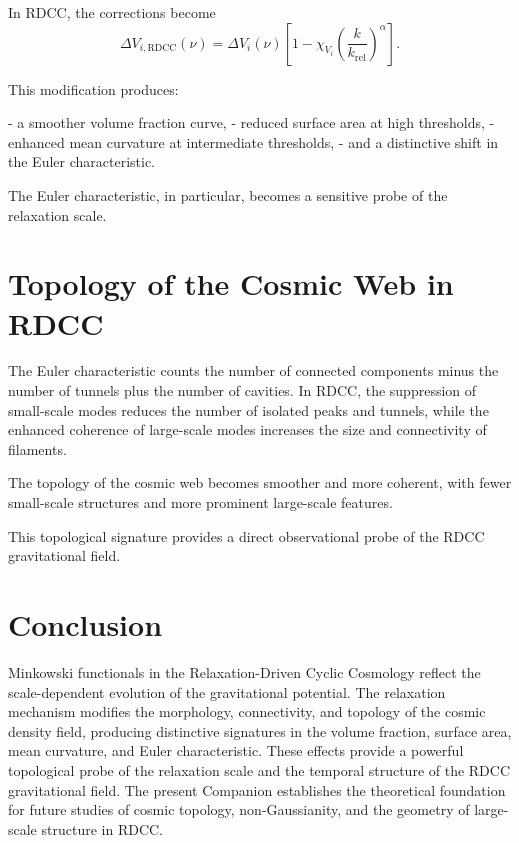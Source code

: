 \documentclass[11pt,a4paper]{article}
\begin{document}
In RDCC, the corrections become
\begin{equation}
    \Delta V_{i,\mathrm{RDCC}}(\nu)
    = \Delta V_{i}(\nu)
      \left[
        1 - \chi_{V_{i}}
        \left(\frac{k}{k_{\mathrm{rel}}}\right)^{\alpha}
      \right].
\end{equation}

This modification produces:

- a smoother volume fraction curve,  
- reduced surface area at high thresholds,  
- enhanced mean curvature at intermediate thresholds,  
- and a distinctive shift in the Euler characteristic.

The Euler characteristic, in particular, becomes a sensitive probe of the 
relaxation scale.
\section{Topology of the Cosmic Web in RDCC}

The Euler characteristic counts the number of connected components minus the number 
of tunnels plus the number of cavities. In RDCC, the suppression of small-scale 
modes reduces the number of isolated peaks and tunnels, while the enhanced 
coherence of large-scale modes increases the size and connectivity of filaments.

The topology of the cosmic web becomes smoother and more coherent, with fewer 
small-scale structures and more prominent large-scale features.

This topological signature provides a direct observational probe of the RDCC 
gravitational field.
\section{Conclusion}

Minkowski functionals in the Relaxation-Driven Cyclic Cosmology reflect the 
scale-dependent evolution of the gravitational potential. The relaxation mechanism 
modifies the morphology, connectivity, and topology of the cosmic density field, 
producing distinctive signatures in the volume fraction, surface area, mean 
curvature, and Euler characteristic. These effects provide a powerful topological 
probe of the relaxation scale and the temporal structure of the RDCC gravitational 
field. The present Companion establishes the theoretical foundation for future 
studies of cosmic topology, non-Gaussianity, and the geometry of large-scale 
structure in RDCC.
\end{document}
